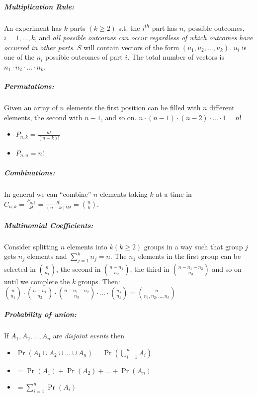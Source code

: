 \documentclass[landscape,10pt]{article}
\begin{document}
\begin{multicols}{4}
    \subparagraph*{Multiplication Rule: } 
        An experiment has \(k\) parts \((k \geq 2)\) s.t. the \(i^{th}\) part has \(n_i\) possible outcomes, \(i = 1, \ldots, k\), and \textit{all possible outcomes can occur regardless of which outcomes have occurred in other parts}. \(S\) will contain vectors of the form \((u_1, u_2, \ldots, u_k)\). \(u_i\) is one of the \(n_i\) possible outcomes of part \(i\). The total number of vectors is \(n_1 \cdot n_2 \cdot \ldots \cdot n_k\).

    \subparagraph*{Permutations: } 
        Given an array of \(n\) elements the first position can be filled with \(n\) different elements, the second with \(n-1\), and so on. \(n \cdot (n-1) \cdot (n-2) \cdot \ldots \cdot 1 = n!\)

        \begin{itemize}
            \item[] \(P_{n,k} = \frac{n!}{(n-k)!}\)
            \item[] \(P_{n,n} = n!\)
        \end{itemize}

    \subparagraph*{Combinations: }
        In general we can ``combine'' \(n\) elements taking \(k\) at a time in \(C_{n,k} = \frac{P_{n,k}}{k!} = \frac{n!}{(n-k)!k!} = {n \choose k} \). 

    \subparagraph*{Multinomial Coefficients: } 
        Consider splitting \(n\) elements into \(k (k \geq 2)\) groups in a way such that group \(j\) gets \(n_j\) elements and \(\sum_{j = 1}^{k}n_j = n\). The \(n_1\) elements in the first group can be selected in \({n \choose n_1}\), the second in \({n-n_1 \choose n_2}\), the third in \({n-n_1-n_2 \choose n_3}\) and so on until we complete the \(k\) groups. Then: \({n \choose n_1}\cdot{n-n_1 \choose n_2}\cdot{n-n_1-n_2 \choose n_3}\cdot \ldots \cdot{n_k \choose n_k} = {n \choose n_1, n_2, \ldots, n_k}\)

    \subparagraph*{Probability of union:}
        If \(A_1, A_2, \ldots, A_n\) are \textit{disjoint events} then 
        \begin{itemize}
            \item[] \(\Pr(A_1 \cup A_2 \cup \ldots \cup A_n) = \Pr(\bigcup\limits_{i=1}^{n}A_i) \)
            \item[] \(= \Pr(A_1) + \Pr(A_2) + \ldots + \Pr(A_n) \)
            \item[] \(= \sum\limits_{i=1}^{n}\Pr(A_i) \)
        \end{itemize}
        \smallskip


\end{multicols}
\end{document}
